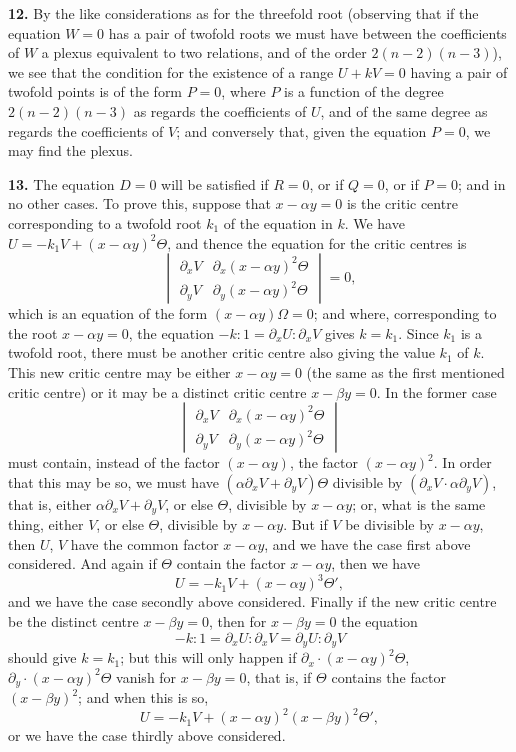 \documentclass[11pt,a4paper]{article}
\begin{document}
\medskip

\textbf{12.} By the like considerations as for the threefold root (observing that if the equation $W = 0$ has a pair of twofold roots we must have between the coefficients of $W$ a plexus equivalent to two relations, and of the order $2(n - 2)(n - 3)$), we see that the condition for the existence of a range $U + kV = 0$ having a pair of twofold points is of the form $P = 0$, where $P$ is a function of the degree $2(n - 2)(n - 3)$ as regards the coefficients of $U$, and of the same degree as regards the coefficients of $V$; and conversely that, given the equation $P = 0$, we may find the plexus.

\medskip

\textbf{13.} The equation $D = 0$ will be satisfied if $R = 0$, or if $Q = 0$, or if $P = 0$; and in no other cases. To prove this, suppose that $x - \alpha y = 0$ is the critic centre corresponding to a twofold root $k_1$ of the equation in $k$. We have $U = -k_1 V + (x - \alpha y)^2 \Theta$, and thence the equation for the critic centres is
\[
\begin{vmatrix} \partial_x V & \partial_x(x - \alpha y)^2 \Theta\\ \partial_y V & \partial_y(x - \alpha y)^2 \Theta\end{vmatrix} = 0,
\]
which is an equation of the form $(x - \alpha y)\Omega = 0$; and where, corresponding to the root $x - \alpha y = 0$, the equation $-k : 1 = \partial_x U : \partial_x V$ gives $k = k_1$. Since $k_1$ is a twofold root, there must be another critic centre also giving the value $k_1$ of $k$. This new critic centre may be either $x - \alpha y = 0$ (the same as the first mentioned critic centre) or it may be a distinct critic centre $x - \beta y = 0$. In the former case
\[
\begin{vmatrix} \partial_x V & \partial_x(x - \alpha y)^2 \Theta\\ \partial_y V & \partial_y(x - \alpha y)^2 \Theta\end{vmatrix}
\]
must contain, instead of the factor $(x - \alpha y)$, the factor $(x - \alpha y)^2$. In order that this may be so, we must have $(\alpha\partial_x V + \partial_y V)\Theta$ divisible by $(\partial_x V \cdot \alpha\partial_y V)$, that is, either $\alpha\partial_x V + \partial_y V$, or else $\Theta$, divisible by $x - \alpha y$; or, what is the same thing, either $V$, or else $\Theta$, divisible by $x - \alpha y$. But if $V$ be divisible by $x - \alpha y$, then $U$, $V$ have the common factor $x - \alpha y$, and we have the case first above considered. And again if $\Theta$ contain the factor $x - \alpha y$, then we have
\[
U = -k_1 V + (x - \alpha y)^3 \Theta',
\]
and we have the case secondly above considered. Finally if the new critic centre be the distinct centre $x - \beta y = 0$, then for $x - \beta y = 0$ the equation
\[
-k : 1 = \partial_x U : \partial_x V = \partial_y U : \partial_y V
\]
should give $k = k_1$; but this will only happen if $\partial_x \cdot (x - \alpha y)^2 \Theta$, $\partial_y \cdot (x - \alpha y)^2 \Theta$ vanish for $x - \beta y = 0$, that is, if $\Theta$ contains the factor $(x - \beta y)^2$; and when this is so,
\[
U = -k_1 V + (x - \alpha y)^2 (x - \beta y)^2 \Theta',
\]
or we have the case thirdly above considered.
\end{document}
